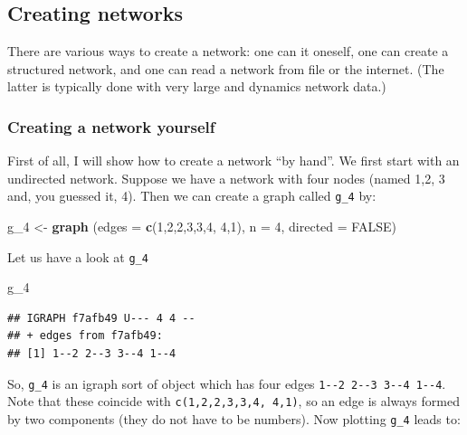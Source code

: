 \documentclass[]{article}
\newenvironment{Shaded}{\begin{snugshade}}{\end{snugshade}}
\newcommand{\KeywordTok}[1]{\textcolor[rgb]{0.13,0.29,0.53}{\textbf{#1}}}
\newcommand{\DataTypeTok}[1]{\textcolor[rgb]{0.13,0.29,0.53}{#1}}
\newcommand{\DecValTok}[1]{\textcolor[rgb]{0.00,0.00,0.81}{#1}}
\newcommand{\StringTok}[1]{\textcolor[rgb]{0.31,0.60,0.02}{#1}}
\newcommand{\OtherTok}[1]{\textcolor[rgb]{0.56,0.35,0.01}{#1}}
\newcommand{\NormalTok}[1]{#1}
\theoremstyle{definition}
\theoremstyle{definition}
\theoremstyle{definition}
\theoremstyle{remark}
\begin{document}
\subsection{Creating networks}\label{creating-networks}

There are various ways to create a network: one can it oneself, one can
create a structured network, and one can read a network from file or the
internet. (The latter is typically done with very large and dynamics
network data.)

\subsubsection{Creating a network
yourself}\label{creating-a-network-yourself}

First of all, I will show how to create a network ``by hand''. We first
start with an undirected network. Suppose we have a network with four
nodes (named 1,2, 3 and, you guessed it, 4). Then we can create a graph
called \texttt{g\_4} by:

\begin{Shaded}
\begin{Highlighting}[]
\NormalTok{g_}\DecValTok{4}\NormalTok{ <-}\StringTok{ }\KeywordTok{graph}\NormalTok{ (}\DataTypeTok{edges =} \KeywordTok{c}\NormalTok{(}\DecValTok{1}\NormalTok{,}\DecValTok{2}\NormalTok{,}\DecValTok{2}\NormalTok{,}\DecValTok{3}\NormalTok{,}\DecValTok{3}\NormalTok{,}\DecValTok{4}\NormalTok{, }\DecValTok{4}\NormalTok{,}\DecValTok{1}\NormalTok{), }\DataTypeTok{n =} \DecValTok{4}\NormalTok{, }\DataTypeTok{directed =} \OtherTok{FALSE}\NormalTok{)}
\end{Highlighting}
\end{Shaded}

Let us have a look at \texttt{g\_4}

\begin{Shaded}
\begin{Highlighting}[]
\NormalTok{g_}\DecValTok{4}
\end{Highlighting}
\end{Shaded}

\begin{verbatim}
## IGRAPH f7afb49 U--- 4 4 -- 
## + edges from f7afb49:
## [1] 1--2 2--3 3--4 1--4
\end{verbatim}

So, \texttt{g\_4} is an igraph sort of object which has four edges
\texttt{1-\/-2\ 2-\/-3\ 3-\/-4\ 1-\/-4}. Note that these coincide with
\texttt{c(1,2,2,3,3,4,\ 4,1)}, so an edge is always formed by two
components (they do not have to be numbers). Now plotting \texttt{g\_4}
leads to:
\end{document}
